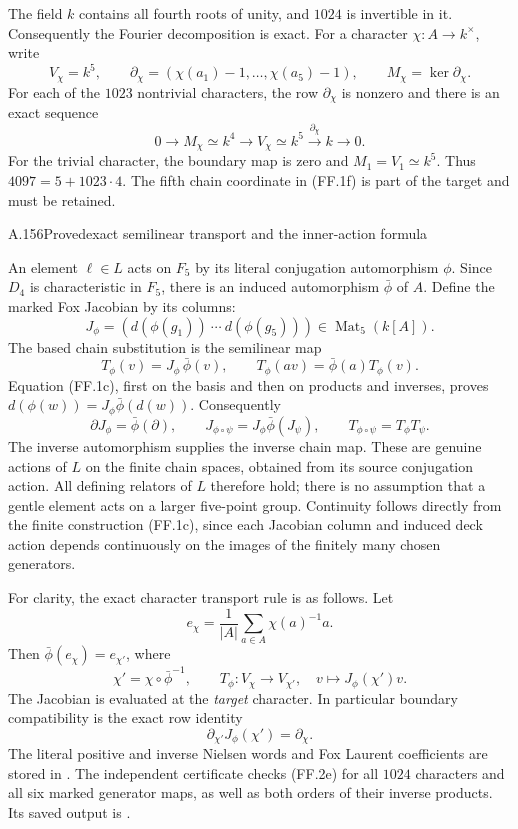 The field $k$ contains all fourth roots of unity, and $1024$
is invertible in it. Consequently the Fourier decomposition is
exact. For a character $\chi:A\to k^\times$, write
\[
 V_\chi=k^5,\qquad
 \partial_\chi=(\chi(a_1)-1,\ldots,\chi(a_5)-1),\qquad
 M_\chi=\ker\partial_\chi.
 \tag{FF.1e}
\]
For each of the $1023$ nontrivial characters, the row
$\partial_\chi$ is nonzero and there is an exact sequence
\[
 0\longrightarrow M_\chi\simeq k^4
 \longrightarrow V_\chi\simeq k^5
 \stackrel{\partial_\chi}{\longrightarrow}k
 \longrightarrow0.
 \tag{FF.1f}
\]
For the trivial character, the boundary map is zero and
$M_1=V_1\simeq k^5$. Thus
$4097=5+1023\cdot4$. The fifth chain coordinate in
(FF.1f) is part of the target and must be retained.

\begin{statement}{A.156}{Proved}{exact semilinear transport and the inner-action formula}
\end{statement}
An element $\ell\in L$ acts on $F_5$ by its literal conjugation
automorphism $\phi$. Since $D_4$ is characteristic in $F_5$,
there is an induced automorphism $\bar\phi$ of $A$. Define
the marked Fox Jacobian by its columns:
\[
 J_\phi=(d(\phi(g_1))\ \cdots\ d(\phi(g_5)))
       \in\operatorname{Mat}_5(k[A]).
 \tag{FF.2a}
\]
The based chain substitution is the semilinear map
\[
 T_\phi(v)=J_\phi\,\bar\phi(v),\qquad
 T_\phi(av)=\bar\phi(a)T_\phi(v).
 \tag{FF.2b}
\]
Equation (FF.1c), first on the basis and then on products and
inverses, proves
$d(\phi(w))=J_\phi\bar\phi(d(w))$. Consequently
\[
 \partial J_\phi=\bar\phi(\partial),\qquad
 J_{\phi\circ\psi}=J_\phi\bar\phi(J_\psi),\qquad
 T_{\phi\circ\psi}=T_\phi T_\psi.
 \tag{FF.2c}
\]
The inverse automorphism supplies the inverse chain map.
These are genuine actions of $L$ on the finite chain spaces,
obtained from its source conjugation action. All defining
relators of $L$ therefore hold; there is no assumption that
a gentle element acts on a larger five-point group.
Continuity follows directly from the finite construction
(FF.1c), since each Jacobian column and induced deck action
depends continuously on the images of the finitely many
chosen generators.

For clarity, the exact character transport rule is as follows.
Let
\[
 e_\chi=\frac1{|A|}\sum_{a\in A}\chi(a)^{-1}a.
\]
Then $\bar\phi(e_\chi)=e_{\chi'}$, where
\[
 \boxed{\quad \chi'=\chi\circ\bar\phi^{-1},\qquad
 T_\phi:V_\chi\longrightarrow V_{\chi'},\quad
 v\longmapsto J_\phi(\chi')v.\quad}
 \tag{FF.2d}
\]
The Jacobian is evaluated at the \emph{target} character.
In particular boundary compatibility is the exact row identity
\[
                \partial_{\chi'}J_\phi(\chi')=\partial_\chi.
 \tag{FF.2e}
\]
The literal positive and inverse Nielsen words and Fox Laurent
coefficients are stored in
.
The independent certificate
 checks (FF.2e) for
all $1024$ characters and all six marked generator maps,
as well as both orders of their inverse products. Its saved
output is .

